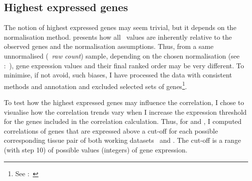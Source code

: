 \subsection{Highest expressed genes}\label{subsec:mrnaHighExp}

The notion of highest expressed genes may seem trivial,
but it depends on the normalisation method.
 presents how all \Rnaseq\ values are inherently relative
to the observed genes and the normalisation assumptions.
Thus, from a same unnormalised (\ie\ \emph{raw count}) sample,
depending on the chosen normalisation
(see :~),
gene expression values and their final ranked order may be very different.
To minimise, if not avoid, such biases,
I have processed the data with consistent methods and annotation
and excluded selected sets of
genes\footnote{See :~}.\mybr\

To test how the highest expressed genes may influence the correlation,
I chose to visualise how the correlation trends vary
when I increase the expression threshold for the genes included
in the correlation calculation.
Thus, for  and ,
I computed correlations of genes that are expressed above a cut-off
for each possible corresponding tissue pair of both working datasets \setOne\ and \setTwo.
The cut-off is a range (with step 10) of possible values (integers) of gene expression.\mybr\

